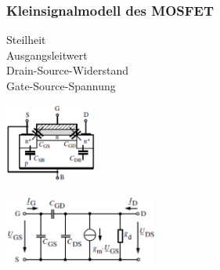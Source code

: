             \subsubsection{Kleinsignalmodell des MOSFET}
            \begin{minipage}[T]{10.5cm}
                Steilheit
                \hspace{29.3mm}\\
                Ausgangsleitwert
                \hspace{15.9mm}\\
                Drain-Source-Widerstand
                \hspace{3mm}\\
                Gate-Source-Spannung
                \hspace{7mm}
            \end{minipage}
            \begin{minipage}[T]{3.5cm}
                \includegraphics[width=3cm]{./images/MOSFET_Aufbau.png}
            \end{minipage}
            \begin{minipage}[T]{5cm}
                \includegraphics[width=5cm]{./images/MOSFET_Ersatzsch.png}
            \end{minipage}

